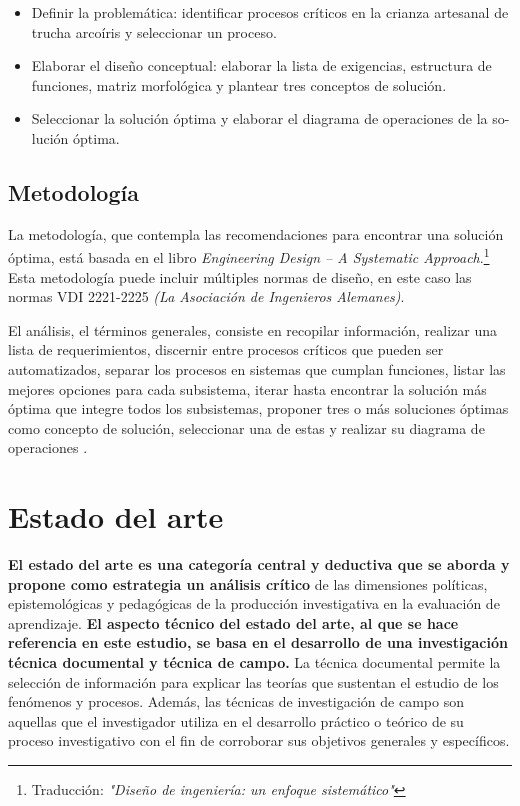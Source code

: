 \begin{itemize}
\item Definir la problemática: identificar procesos críticos en la crianza artesanal de trucha arcoíris y seleccionar un proceso.
\item Elaborar el diseño conceptual: elaborar la lista de exigencias, estructura de funciones, matriz morfológica y plantear tres conceptos de solución.
\item Seleccionar la solución óptima y elaborar el diagrama de operaciones de la so-lución óptima. 
\end{itemize}

\subsection{Metodología}

La metodología, que contempla las recomendaciones para encontrar una solución óptima, está basada en el libro \textit{Engineering Design – A Systematic Approach}.\footnote{Traducción: \textit{"Diseño de ingeniería: un enfoque sistemático"}}  Esta metodología puede incluir múltiples normas de diseño, en este caso las normas VDI 2221-2225 \textit{(La Asociación de Ingenieros Alemanes)}.

El análisis, el términos generales, consiste en recopilar información, realizar una lista de requerimientos, discernir entre procesos críticos que pueden ser automatizados, separar los procesos en sistemas que cumplan funciones, listar las mejores opciones para cada subsistema, iterar hasta encontrar la solución más óptima que integre todos los subsistemas, proponer tres o más soluciones óptimas como concepto de solución, seleccionar una de estas y realizar su diagrama de operaciones .

\section{Estado del arte}
\textbf{El estado del arte es una categoría central y deductiva que se aborda y propone como estrategia un análisis crítico} de las dimensiones políticas, epistemológicas y pedagógicas de la producción investigativa en la evaluación de aprendizaje.\cite{GuevaraPatino2016} \textbf{El aspecto técnico del estado del arte, al que se hace referencia en este estudio, se basa en el desarrollo de una investigación técnica documental y técnica de campo.} La técnica documental permite la selección de información para explicar las teorías que sustentan el estudio de los fenómenos y procesos.\cite{Martinez2003} Además, las técnicas de investigación de campo son aquellas que el investigador utiliza en el desarrollo práctico o teórico de su proceso investigativo con el fin de corroborar sus objetivos generales y específicos.\cite{GuevaraPatino2016}

